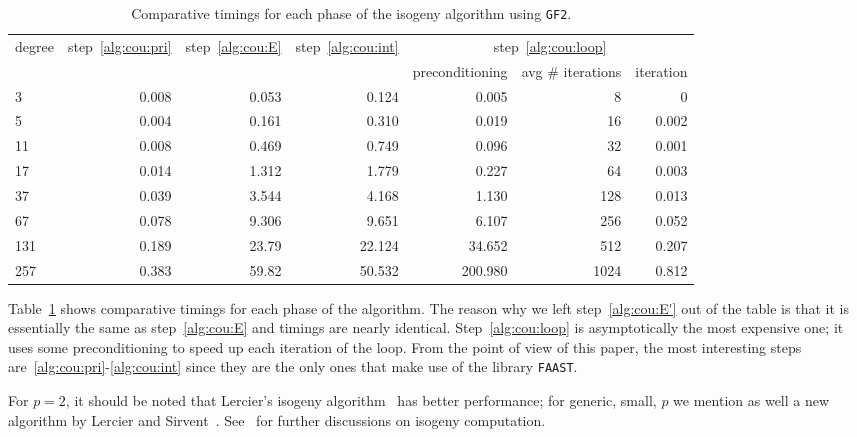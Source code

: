 \begin{table}
  \centering
  \begin{tabular}{l | r | r | r | r | r | r}
    degree & step~\ref{alg:cou:pri} & step~\ref{alg:cou:E} & step~\ref{alg:cou:int} & \multicolumn{3}{|c}{step~\ref{alg:cou:loop}} \\
    &&&&preconditioning & avg \# iterations & iteration\\
    \hline
    3 & 0.008 & 0.053 & 0.124 & 0.005 & 8 & 0\\
    5 & 0.004 & 0.161 & 0.310 & 0.019 & 16 & 0.002\\ 
    11 & 0.008 & 0.469 & 0.749 & 0.096 & 32 & 0.001\\
    17 & 0.014 & 1.312 & 1.779 & 0.227 & 64 & 0.003\\
    37 & 0.039 & 3.544 & 4.168 & 1.130 & 128 & 0.013\\
    67 & 0.078 & 9.306 & 9.651 & 6.107 & 256 & 0.052\\
    131 & 0.189 & 23.79 & 22.124 & 34.652 & 512 & 0.207\\
    257 & 0.383 & 59.82 & 50.532 & 200.980 & 1024 & 0.812\\
  \end{tabular}
  \caption{Comparative timings for each phase of the isogeny algorithm using \texttt{GF2}.}
  \label{tab:couveignes}
\end{table}

Table~\ref{tab:couveignes} shows comparative timings for each phase of
the algorithm.  The reason why we left step~\ref{alg:cou:E'} out of
the table is that it is essentially the same as step~\ref{alg:cou:E}
and timings are nearly identical. Step~\ref{alg:cou:loop} is
asymptotically the most expensive one; it uses some preconditioning to
speed up each iteration of the loop. From the point of view of this
paper, the most interesting steps
are~\ref{alg:cou:pri}-\ref{alg:cou:int} since they are the only ones
that make use of the library \texttt{FAAST}.

For $p=2$, it should be noted that Lercier's isogeny
algorithm~\cite{Lercier96} has better performance; for generic, small,
$p$ we mention as well a new algorithm by Lercier and
Sirvent~\cite{LeSi09}. See~\cite{DeFeo10} for further discussions on
isogeny computation.



%
